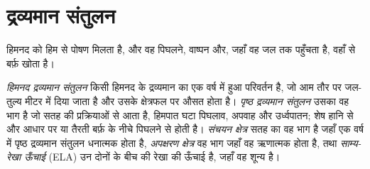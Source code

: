 \section{द्रव्यमान संतुलन}\label{sec:b3:glaciology:mass-balance}

हिमनद को हिम से पोषण मिलता है, और वह पिघलने, वाष्पन और, जहाँ वह जल तक पहुँचता है,
वहाँ  से बर्फ़ खोता है।

\begin{definition}\label{def:b3:glaciology:mass-balance}
\emph{हिमनद द्रव्यमान संतुलन} किसी हिमनद के द्रव्यमान का एक वर्ष में हुआ परिवर्तन है,
जो आम तौर पर जल-तुल्य मीटर में दिया जाता है
और उसके क्षेत्रफल पर औसत होता है। \emph{पृष्ठ द्रव्यमान
संतुलन} उसका वह भाग है जो सतह की प्रक्रियाओं से आता है,
हिमपात घटा पिघलाव, अपवाह और उर्ध्वपातन; शेष हानि
 से और आधार पर या तैरती बर्फ़ के नीचे पिघलने से होती है।
\emph{संचयन क्षेत्र} सतह का वह भाग है जहाँ
एक वर्ष में पृष्ठ द्रव्यमान संतुलन धनात्मक होता है,
\emph{अपक्षरण क्षेत्र} वह भाग जहाँ वह ऋणात्मक होता है,
तथा \emph{साम्य-रेखा ऊँचाई}
(ELA) उन दोनों के बीच की रेखा की ऊँचाई है, जहाँ वह शून्य है।
\end{definition}

